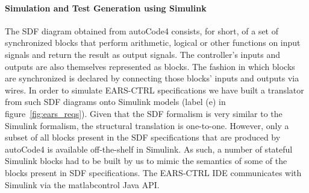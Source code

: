 \paragraph{\textbf{Simulation and Test Generation using Simulink}}
The SDF diagram obtained from \textsf{autoCode4} consists, for
short, of a set of synchronized blocks that perform arithmetic, logical or other functions
on input signals and return the result as output signals. The
controller's inputs and outputs are also themselves represented as blocks. The
fashion in which blocks are synchronized is declared by connecting those blocks'
inputs and outputs via wires. In order to simulate \textsf{EARS-CTRL}
specifications we have built a translator from such SDF diagrams onto Simulink
models (label (\textsf{e}) in figure~\ref{fig:ears_reqs}). Given that the SDF
formalism is very similar to the Simulink formalism, the structural translation is one-to-one. However, only a subset of all blocks
present in the SDF specifications that are produced by \textsf{autoCode4} is
available off-the-shelf in Simulink. As such, a number of stateful Simulink
blocks had to be built by us to mimic the semantics of some of the blocks
present in SDF specifications. The \textsf{EARS-CTRL} IDE
communicates with Simulink via the \textsf{matlabcontrol}\cite{mathlabcontrol}
Java API.
